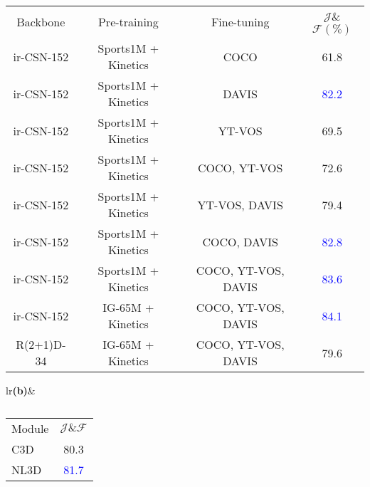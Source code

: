 \documentclass{bmvc2k}
\begin{document}
\begin{table}[t]
    \centering
    \footnotesize
        \begin{subtable}[t]{0.65\textwidth}
        {
            \begin{tabular}[t]{c| c | c | c }
\toprule
             {\footnotesize Backbone} & Pre-training & Fine-tuning & $\mathcal{J}$\&$\mathcal{F} (\%)$  \\
            \cmidrule(lr){1-4}
                            ir-CSN-152 & Sports1M + Kinetics & COCO& 61.8 \\
                            ir-CSN-152 & Sports1M + Kinetics & DAVIS & \textcolor{blue}{82.2} \\
                            ir-CSN-152 & Sports1M + Kinetics & YT-VOS&
                            69.5 \\
                            ir-CSN-152 & Sports1M + Kinetics &COCO, YT-VOS& 72.6 \\
                            ir-CSN-152 & Sports1M + Kinetics &YT-VOS, DAVIS& 79.4 \\
                            ir-CSN-152 & Sports1M + Kinetics &COCO, DAVIS& \textcolor{blue}{82.8} \\
            \cmidrule(lr){1-4}
                            ir-CSN-152 &Sports1M + Kinetics &COCO, YT-VOS, DAVIS& \textcolor{blue}{83.6}\\
                            ir-CSN-152 &IG-65M + Kinetics &COCO, YT-VOS, DAVIS& \textcolor{blue}{84.1}\\
            \cmidrule(lr){1-4}
                            R(2+1)D-34 &IG-65M + Kinetics& COCO, YT-VOS, DAVIS & 79.6\\
            \bottomrule
            \end{tabular}
            \caption{}
\label{tab:ablation_data}
        }
        \end{subtable}
        \hfill
        \begin{subtable}[t]{0.25\linewidth}{
            \begin{tabular}[t]{lr}{\scriptsize\textbf{(b)}}&\hspace{-3mm}
            \begin{subtable}[t]{\linewidth}
            {
            \begin{tabular}[t]{l | c} \toprule
                Module & $\mathcal{J}\&\mathcal{F}$ \\
\cmidrule(lr){1-2}
                    C3D  &  80.3\\
                    NL3D  & \textcolor{blue}{81.7}\\

\end{tabular}}
\end{subtable}
\end{tabular}}
\end{subtable}
\end{table}
\end{document}
